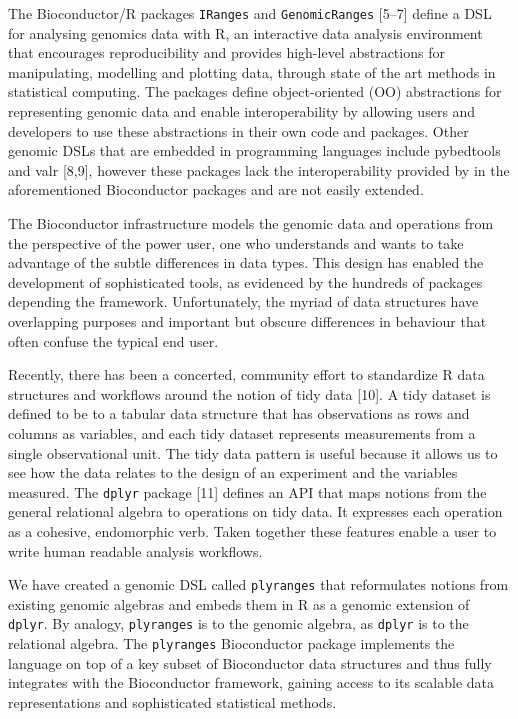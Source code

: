 \documentclass[10pt,letterpaper]{article}
\begin{document}
The Bioconductor/R packages \texttt{IRanges} and \texttt{GenomicRanges}
{[}5--7{]} define a DSL for analysing genomics data with R, an
interactive data analysis environment that encourages reproducibility
and provides high-level abstractions for manipulating, modelling and
plotting data, through state of the art methods in statistical
computing. The packages define object-oriented (OO) abstractions for
representing genomic data and enable interoperability by allowing users
and developers to use these abstractions in their own code and packages.
Other genomic DSLs that are embedded in programming languages include
pybedtools and valr {[}8,9{]}, however these packages lack the
interoperability provided by in the aforementioned Bioconductor packages
and are not easily extended.

The Bioconductor infrastructure models the genomic data and operations
from the perspective of the power user, one who understands and wants to
take advantage of the subtle differences in data types. This design has
enabled the development of sophisticated tools, as evidenced by the
hundreds of packages depending the framework. Unfortunately, the myriad
of data structures have overlapping purposes and important but obscure
differences in behaviour that often confuse the typical end user.

Recently, there has been a concerted, community effort to standardize R
data structures and workflows around the notion of tidy data {[}10{]}. A
tidy dataset is defined to be to a tabular data structure that has
observations as rows and columns as variables, and each tidy dataset
represents measurements from a single observational unit. The tidy data
pattern is useful because it allows us to see how the data relates to
the design of an experiment and the variables measured. The
\texttt{dplyr} package {[}11{]} defines an API that maps notions from
the general relational algebra to operations on tidy data. It expresses
each operation as a cohesive, endomorphic verb. Taken together these
features enable a user to write human readable analysis workflows.

We have created a genomic DSL called \texttt{plyranges} that
reformulates notions from existing genomic algebras and embeds them in R
as a genomic extension of \texttt{dplyr}. By analogy, \texttt{plyranges}
is to the genomic algebra, as \texttt{dplyr} is to the relational
algebra. The \texttt{plyranges} Bioconductor package implements the
language on top of a key subset of Bioconductor data structures and thus
fully integrates with the Bioconductor framework, gaining access to its
scalable data representations and sophisticated statistical methods.
\end{document}
